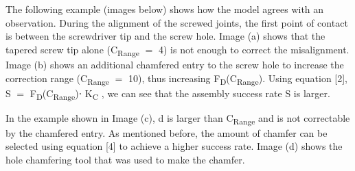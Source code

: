 \documentclass[11pt]{book}
\begin{document}
The following example (images below) shows how the model agrees with an observation. During the alignment of the screwed joints, the first point of contact is between the screwdriver tip and the screw hole. Image (a) shows that the tapered screw tip alone (C\textsubscript{Range} $=$ 4) is not enough to correct the misalignment. Image (b) shows an additional chamfered entry to the screw hole to increase the correction range (C\textsubscript{Range} $=$ 10), thus increasing F\textsubscript{D}(C\textsubscript{Range}). Using equation [2], S $=$ F\textsubscript{D}(C\textsubscript{Range})⋅ K\textsubscript{C }, we can see that the assembly success rate S is larger. 

In the example shown in Image (c), d is larger than C\textsubscript{Range} and is not correctable by the chamfered entry. As mentioned before,\textit{ }the amount of chamfer can be selected using equation [4] to achieve a higher success rate. Image (d) shows the hole chamfering tool that was used to make the chamfer.
\end{document}
